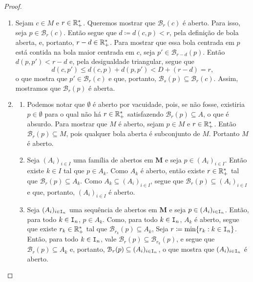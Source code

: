 \begin{proof}
	\begin{enumerate}
	\item Sejam $c \in M$ e $r \in \mathbb{R}_+^*$. Queremos mostrar que $\mathcal B_r(c)$ é aberto. Para isso, seja $p \in \mathcal B_r(c)$. Então segue que $d \coloneqq d(c,p) < r$, pela definição de bola aberta, e, portanto, $r-d \in \mathbb{R}_+^*$. Para mostrar que essa bola centrada em $p$ está contida na bola maior centrada em $c$, seja $p' \in \mathcal B_{r-d}(p)$. Então $d(p,p')<r-d$ e, pela desigualdade triangular, segue que
	\begin{equation*}
	d(c,p') \leq d(c,p) + d(p,p') < D + (r-d) = r,
	\end{equation*}
o que mostra que $p' \in \mathcal B_r(c)$ e que, portanto, $\mathcal B_s(p) \subseteq \mathcal B_r(c)$. Assim, mostramos que $\mathcal B_r(p)$ é aberta.
	
	\item
		\begin{enumerate}
		\item Podemos notar que $\emptyset$ é aberto por vacuidade, pois, se não fosse, existiria $p \in \emptyset$ para o qual não há $r \in \mathbb{R}_+^*$ satisfazendo $\mathcal B_r(p) \subseteq A$, o que é absurdo.
	Para mostrar que $M$ é aberto, sejam $p \in M$ e $r \in \mathbb{R}_+^*$. Então $\mathcal B_r(p) \subseteq M$, pois qualquer bola aberta é subconjunto de $M$. Portanto $M$ é aberto.
	
		\item Seja $(A_i)_{i \in I}$ uma família de abertos em $\bm M$ e seja $p \in (A_i)_{i \in I}$. Então existe $k \in I$ tal que $p \in A_k$. Como $A_k$ é aberto, então existe $r \in \mathbb{R}_+^*$ tal que $\mathcal B_r(p) \subseteq A_k$. Como $A_k \subseteq (A_i)_{i \in I}$, segue que $\mathcal B_r(p) \subseteq (A_i)_{i \in I}$ e que, portanto, $(A_i)_{i \in I}$ é aberto.
	
		\item Seja $(A_i)_{i \in \mathtt I_n}$ uma sequência de abertos em $\bm M$ e seja $p \in (A_i)_{i \in \mathtt I_n}$. Então, para todo $k \in \mathtt I_n$, $p \in A_k$. Como, para todo $k \in \mathtt I_n$, $A_k$ é aberto, segue que existe $r_k \in \mathbb{R}_+^*$ tal que $\mathcal B_{r_k}(p) \subseteq A_k$, Seja $r \coloneqq \min \{r_k : k \in \mathtt I_n\}$. Então, para todo $k \in \mathtt I_n$, vale $\mathcal B_r(p) \subseteq \mathcal B_{r_k}(p)$, e segue que $\mathcal B_r(p) \subseteq A_k$ e, portanto, $\mathcal B_r(p) \subseteq (A_i)_{i \in \mathtt I_n}$, o que mostra que $(A_i)_{i \in \mathtt I_n}$ é aberto.
		\end{enumerate}		
	\end{enumerate}
\end{proof}

